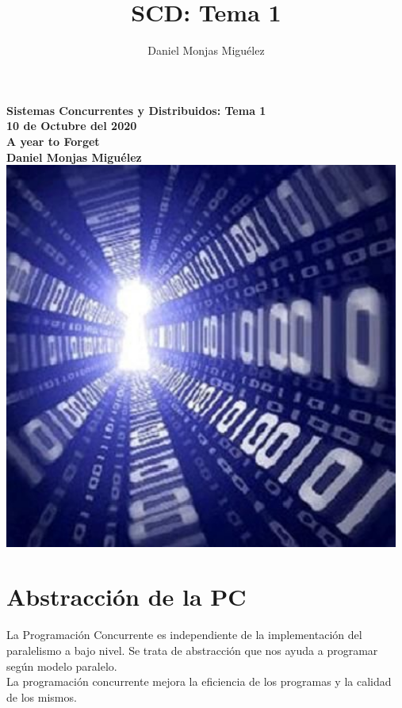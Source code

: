 \documentclass[a4paper,11pt]{article}
\author{Daniel Monjas Miguélez}
\title{SCD: Tema 1}
\begin{document}
\begin{titlepage}
\centering
    \vfill
    {\bfseries\Large
       	Sistemas Concurrentes y Distribuidos: Tema 1\\
        10 de Octubre del 2020\\
        A year to Forget \\
        \vskip2cm
        Daniel Monjas Miguélez\\
    }    
    \vfill
    \includegraphics[width=13cm]{binario.jpg}
    \vfill
    \vfill
\end{titlepage}

\newpage
\tableofcontents
\newpage

\section{Abstracción de la PC}
La Programación Concurrente es independiente de la implementación del paralelismo a bajo nivel. Se trata de abstracción que nos ayuda a programar según modelo paralelo. \\

La programación concurrente mejora la eficiencia de los programas y la calidad de los mismos.
\end{document}
